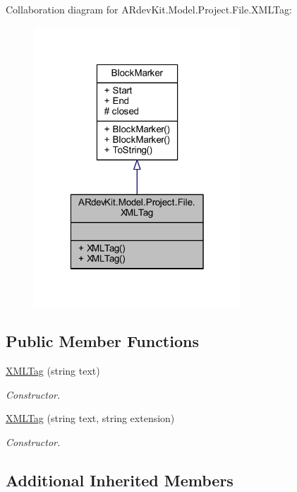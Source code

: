 Collaboration diagram for A\-Rdev\-Kit.\-Model.\-Project.\-File.\-X\-M\-L\-Tag\-:
\nopagebreak
\begin{figure}[H]
\begin{center}
\leavevmode
\includegraphics[width=220pt]{class_a_rdev_kit_1_1_model_1_1_project_1_1_file_1_1_x_m_l_tag__coll__graph}
\end{center}
\end{figure}
\subsection*{Public Member Functions}
\begin{DoxyCompactItemize}
\item 
\hyperlink{class_a_rdev_kit_1_1_model_1_1_project_1_1_file_1_1_x_m_l_tag_a403881a0be75d927f45605dd37f892f7}{X\-M\-L\-Tag} (string text)
\begin{DoxyCompactList}\small\item\em Constructor. \end{DoxyCompactList}\item 
\hyperlink{class_a_rdev_kit_1_1_model_1_1_project_1_1_file_1_1_x_m_l_tag_a147071845dbbac9b266346bfd7c0bb07}{X\-M\-L\-Tag} (string text, string extension)
\begin{DoxyCompactList}\small\item\em Constructor. \end{DoxyCompactList}\end{DoxyCompactItemize}
\subsection*{Additional Inherited Members}


